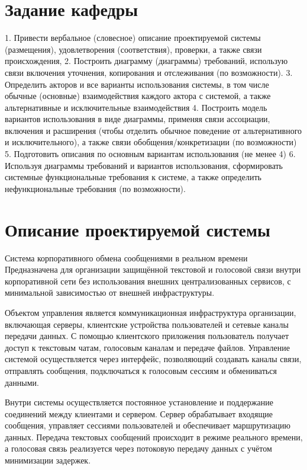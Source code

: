\documentclass[14pt,a4paper]{extarticle}
\begin{document}
\section{Задание кафедры}
\begin{sloppypar}
    1. Привести вербальное (словесное) описание проектируемой системы
    (размещения), удовлетворения (соответствия), проверки, а также связи происхождения,
    2. Построить диаграмму (диаграммы) требований, использую связи включения
    уточнения, копирования и отслеживания (по возможности).
    3. Определить акторов и все варианты использования системы, в том числе обычные
    (основные) взаимодействия каждого актора с системой, а также альтернативные и
    исключительные взаимодействия
    4. Построить модель вариантов использования в виде диаграммы, применяя связи
    ассоциации, включения и расширения (чтобы отделить обычное поведение от
    альтернативного и исключительного), а также связи обобщения/конкретизации (по
    возможности)
    5. Подготовить описания по основным вариантам использования (не менее 4)
    6. Используя диаграммы требований и вариантов использования, сформировать системные
    функциональные требования к системе, а также определить нефункциональные
    требования (по возможности).
\end{sloppypar}

\section{Описание проектируемой системы}

Система корпоративного обмена сообщениями в реальном времени
Предназначена для организации защищённой текстовой и голосовой связи внутри корпоративной сети без использования внешних централизованных сервисов, с минимальной зависимостью от внешней инфраструктуры.

Объектом управления является коммуникационная инфраструктура организации, включающая серверы, клиентские устройства пользователей и сетевые каналы передачи данных. С помощью клиентского приложения пользователь получает доступ к текстовым чатам, голосовым каналам и передаче файлов. Управление системой осуществляется через интерфейс, позволяющий создавать каналы связи, отправлять сообщения, подключаться к голосовым сессиям и обмениваться данными.

Внутри системы осуществляется постоянное установление и поддержание соединений между клиентами и сервером. Сервер обрабатывает входящие сообщения, управляет сессиями пользователей и обеспечивает маршрутизацию данных. Передача текстовых сообщений происходит в режиме реального времени, а голосовая связь реализуется через потоковую передачу данных с учётом минимизации задержек.
\end{document}

